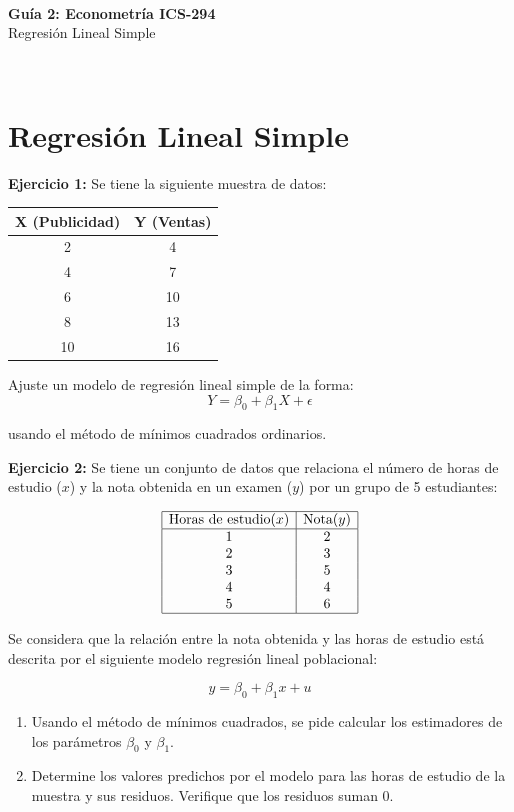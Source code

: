 \documentclass[10pt,a4paper]{article}
\begin{document}
\vspace{5cm}

\begin{center}
\begin{Large}
\textbf{\\Guía 2: Econometría ICS-294}\\
\vspace{0.5cm}
{Regresión Lineal Simple}
\end{Large}\\
\end{center}


\section{Regresión Lineal Simple}

\textbf{Ejercicio 1:} Se tiene la siguiente muestra de datos:
\begin{center}
\begin{tabular}{|c|c|}
\hline
X (Publicidad) & Y (Ventas) \\
\hline
2 & 4 \\
\hline
4 & 7 \\
\hline
6 & 10 \\
\hline
8 & 13 \\
\hline
10 & 16 \\
\hline
\end{tabular}
\end{center}

Ajuste un modelo de regresión lineal simple de la forma:
$$Y = \beta_0 + \beta_1 X + \epsilon $$

usando el método de mínimos cuadrados ordinarios.
\vspace{0.5cm}


\textbf{Ejercicio 2:} 
Se tiene un conjunto de datos que relaciona el número de horas de estudio (\(x\)) y la nota obtenida en un examen (\(y\)) por un grupo de 5 estudiantes:

\[
\begin{array}{|c|c|}
\hline
\text{Horas de estudio} (x) & \text{Nota} (y) \\
\hline
1 & 2 \\
2 & 3 \\
3 & 5 \\
4 & 4 \\
5 & 6 \\
\hline
\end{array}
\]

Se considera que la relación entre la nota obtenida y las horas de estudio 
est\'a descrita por el siguiente modelo regresión lineal poblacional:

\[
y = \beta_0 + \beta_1 x+u
\]

\begin{enumerate}
    \item  Usando el método de mínimos cuadrados, se pide calcular los estimadores de los parámetros \( \beta_0 \) y \( \beta_1 \). 

     \item Determine los valores predichos por el modelo para las horas de estudio de la muestra y sus  residuos. Verifique que los residuos suman 0.

     
 \end{enumerate}
\end{document}
